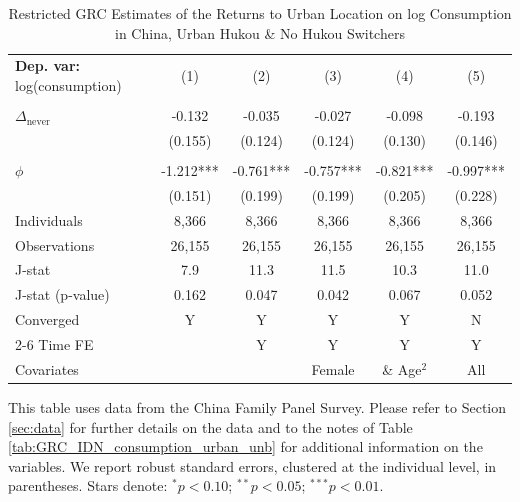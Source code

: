 \begin{table}[htbp] \centering \begin{threeparttable}
 \caption{Restricted GRC Estimates of the Returns to Urban Location on log Consumption in China, Urban Hukou & No Hukou Switchers} 
 \label{tab:GRC_CHN_u_same_consumption_urban_unb} 
\begin{tabular}{l ccccc} \toprule  \textbf{Dep. var:}  log(consumption) 
                    &\multicolumn{1}{c}{(1)}   &\multicolumn{1}{c}{(2)}   &\multicolumn{1}{c}{(3)}   &\multicolumn{1}{c}{(4)}   &\multicolumn{1}{c}{(5)}   \\
                    &               &               &               &               &               \\
\addlinespace
$\Delta_{\text{never}}$&      -0.132   &      -0.035   &      -0.027   &      -0.098   &      -0.193   \\
                    &     (0.155)   &     (0.124)   &     (0.124)   &     (0.130)   &     (0.146)   \\
                    &               &               &               &               &               \\
\addlinespace
$\phi$              &      -1.212***&      -0.761***&      -0.757***&      -0.821***&      -0.997***\\
                    &     (0.151)   &     (0.199)   &     (0.199)   &     (0.205)   &     (0.228)   \\
\addlinespace
Individuals         &       8,366   &       8,366   &       8,366   &       8,366   &       8,366   \\
Observations        &      26,155   &      26,155   &      26,155   &      26,155   &      26,155   \\
J-stat              &         7.9   &        11.3   &        11.5   &        10.3   &        11.0   \\
J-stat (p-value)    &       0.162   &       0.047   &       0.042   &       0.067   &       0.052   \\
Converged           &           Y   &           Y   &           Y   &           Y   &           N   \\
\cmidrule{2-6} Time FE & & Y & Y & Y & Y \\ Covariates & & & Female & \& Age$^2$ & All \\ \bottomrule \end{tabular} \begin{tablenotes}[flushleft] \footnotesize \item{This table uses data from the China Family Panel Survey. Please refer to Section \ref{sec:data} for further details on the data and to the notes of Table \ref{tab:GRC_IDN_consumption_urban_unb} for additional information on the variables. We report robust standard errors, clustered at the individual level, in parentheses. Stars denote: $^{*} p<0.10$; $^{**} p<0.05$; $^{***} p<0.01$.} \end{tablenotes} \end{threeparttable} \end{table}
